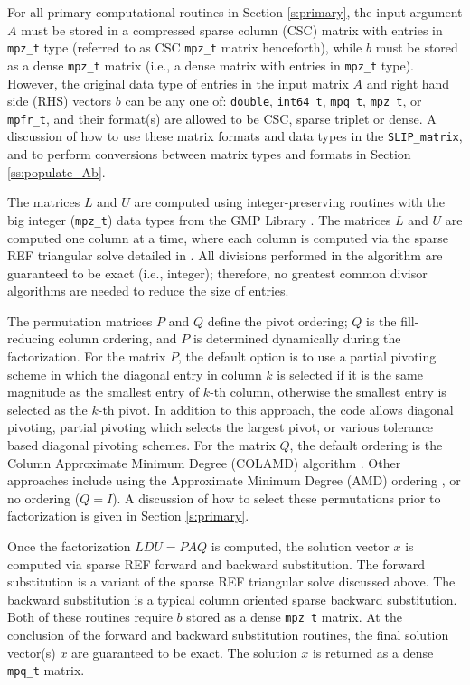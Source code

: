 \documentclass[12pt]{article}
\theoremstyle{definition}
\begin{document}
For all primary computational routines in Section \ref{s:primary}, the input
argument $A$ must be stored in a compressed sparse column (CSC) matrix with
entries in \verb|mpz_t| type (referred to as CSC \verb|mpz_t| matrix
henceforth), while $b$ must be stored as a dense \verb|mpz_t| matrix (i.e., a
dense matrix with entries in \verb|mpz_t| type).  However, the original data
type of entries in the input matrix $A$ and right hand side (RHS)
vectors $b$ can be any one of: \verb|double|, \verb|int64_t|, \verb|mpq_t|,
\verb|mpz_t|, or \verb|mpfr_t|, and their format(s) are allowed to be 
CSC, sparse triplet or dense. A discussion of how to use these
matrix formats and data types in the \verb|SLIP_matrix|, and to
perform conversions between matrix types and formats
in Section \ref{ss:populate_Ab}.

The matrices $L$ and $U$ are computed using integer-preserving
routines with the big integer (\verb|mpz_t|) data types from the GMP Library
\cite{granlund2015gnu}. The matrices $L$ and $U$ are computed one column at a
time, where each column is computed via the sparse REF triangular solve
detailed in \cite{lourenco2019exact}. All divisions performed in the algorithm
are guaranteed to be exact (i.e., integer); therefore, no greatest common
divisor algorithms are needed to reduce the size of entries.

The permutation matrices $P$ and $Q$ define the pivot ordering; $Q$ is the
fill-reducing column ordering, and $P$ is determined dynamically during the
factorization.  For the matrix $P$, the default option is to use a partial
pivoting scheme in which the diagonal entry in column $k$ is selected if it is
the same magnitude as the smallest entry of $k$-th column, otherwise the
smallest entry is selected as the $k$-th pivot. In addition to this approach,
the code allows diagonal pivoting, partial pivoting which selects the largest
pivot, or various tolerance based diagonal pivoting schemes. For the matrix
$Q$, the default ordering is the Column Approximate Minimum Degree (COLAMD)
algorithm \cite{davis2004algorithmcolamd,davis2004column}. Other approaches
include using the Approximate Minimum Degree (AMD) ordering
\cite{amestoy1996approximate,amestoy2004algorithmamd}, or no ordering ($Q=I$).
A discussion of how to select these permutations prior to factorization is
given in Section \ref{s:primary}.

Once the factorization $L D U = P A Q $ is computed, the solution vector 
$x$ is computed via sparse REF forward and backward substitution. 
The forward substitution is a variant of the sparse REF triangular solve 
discussed above. The backward substitution is a typical column oriented 
sparse backward substitution. Both of these routines require $b$ 
stored as a dense \verb|mpz_t| matrix. At the conclusion of the forward and 
backward substitution routines, the final solution vector(s) $x$ 
are guaranteed to be exact.  The solution $x$ is returned as a dense
\verb|mpq_t| matrix.
\end{document}
